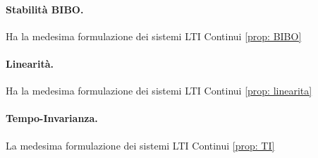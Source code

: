 \paragraph{Stabilità BIBO.}
Ha la medesima formulazione dei sistemi LTI Continui \eqref{prop: BIBO} 

\paragraph{Linearità.}
Ha la medesima formulazione dei sistemi LTI Continui \eqref{prop: linearita} 

\paragraph{Tempo-Invarianza.} 
La medesima formulazione dei sistemi LTI Continui \eqref{prop: TI} 